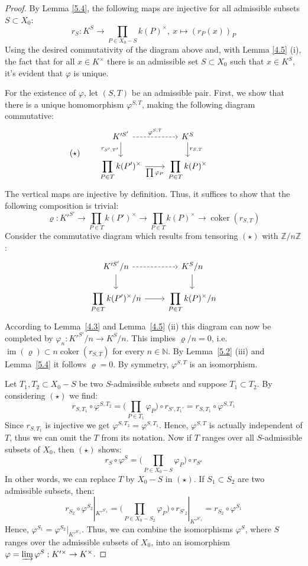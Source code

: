 \begin{proof}
By Lemma \ref{5.4}, the following maps are injective for all admissible subsets $S\subset X_0$:
\[ r_S:K^S \to\prod_{P\in X_0 -  S} k(P)^\times,\ x\mapsto (r_P(x))_P \]
Using the desired commutativity of the diagram above and, with Lemma \ref{4.5} (i), the fact that for all $x\in K^\times$ there is an admissible set $S\subset X_0$ such that $x\in K^S$, it's evident that $\varphi$ is unique. 

For the existence of $\varphi$, let $(S,T)$ be an admissible pair. First, we show that there is a unique homomorphism $\varphi^{S,T}$, making the following diagram commutative:
\[ (\star) \qquad \begin{tikzcd}
K'^{S'} \rar["\varphi^{S,T}", dashed] \dar["r_{S',T'}"'] & K^S \dar["r_{S,T}"]\\
\displaystyle \prod_{P\in T}k(P')^\times \rar["\prod\varphi_P"'] & \displaystyle \prod_{P\in T}k(P)^\times
\end{tikzcd} \phantom{\qquad (\star)} \]
The vertical maps are injective by definition. Thus, it suffices to show that the following composition is trivial:
\[\varrho:K'^{S'}\longrightarrow\prod_{P\in T} k(P')^\times \longrightarrow \prod_{P\in T} k(P)^\times\longrightarrow\operatorname{coker}(r_{S,T})\] 
Consider the commutative diagram which results from tensoring $(\star)$ with $\mathbb{Z}/n\mathbb{Z}$:
\[ \begin{tikzcd}
K'^{S'}/n \rar[dashed]\dar & K^S/n\dar\\
\displaystyle \prod_{P\in T}k(P')^\times/n \rar & \displaystyle \prod_{P\in T}k(P)^\times/n
\end{tikzcd} \]
According to Lemma~\ref{4.3} and Lemma~\ref{4.5} (ii) this diagram can now be completed by $\varphi_n: K'^{S'}/n\to K^S/n$. This implies $\varrho/n=0$, i.e. $\operatorname{im}(\varrho)\subset n\operatorname{coker}(r_{S,T})$ for every $n\in\mathbb{N}$. By Lemma~\ref{5.2} (iii) and Lemma~\ref{5.4} it follows $\varrho = 0$. By symmetry, $\varphi^{S,T}$ is an isomorphism.

Let $T_1, T_2\subset X_0 -  S$ be two $S$-admissible subsets and suppose $T_1\subset T_2$. By considering $(\star)$ we find:
\[ r_{S,T_1}\circ\varphi^{S,T_2}=\Big(\prod_{P\in T_1}\varphi_P\Big)\circ r_{S',T_1'} = r_{S,T_1}\circ\varphi^{S,T_1} \]
Since $r_{S,T_1}$ is injective we get $\varphi^{S,T_2}=\varphi^{S,T_1}$. Hence, $\varphi^{S,T}$ is actually independent of $T$, thus we can omit the $T$ from its notation. Now if $T$ ranges over all $S$-admissible subsets of $X_0$, then $(\star)$ shows:
\[ r_S\circ\varphi^S = \Big(\prod_{P\in X_0 -  S}\varphi_P \Big)\circ r_{S'} \]
In other words, we can replace $T$ by $X_0 -  S$ in $(\star)$. If $S_1\subset S_2$ are two admissible subsets, then:
\[ r_{S_2}\circ\varphi^{S_2}|_{K'^{S'_1}} = \Big(\prod_{P\in X_0 -  S_2}\varphi_P \Big)\circ r_{S'_2}|_{K'^{S'_1}} = r_{S_2}\circ\varphi^{S_1} \]
Hence, $\varphi^{S_1}=\varphi^{S_2}|_{K'^{S'_1}}$. Thus, we can combine the isomorphisms $\varphi^S$, where $S$ ranges over the admissible subsets of $X_0$, into an isomorphism $\varphi = \varinjlim \varphi^S: K'^\times \to K^\times$. 


\end{proof}
